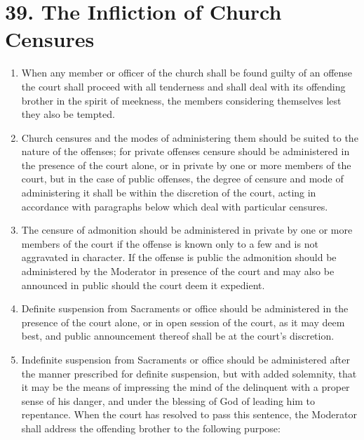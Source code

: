 \documentclass[
]{book}
\begin{document}
\hypertarget{the-infliction-of-church-censures}{%
\section*{39. The Infliction of Church Censures}\label{the-infliction-of-church-censures}}

\protect\hypertarget{chapter-slug-39-the-infliction-of-church-censures}{\href{}{}}

\begin{enumerate}
\def\labelenumi{\arabic{enumi}.}
\item
  \protect\hypertarget{39}{\href{}{}}When any member or officer of the church shall be found guilty of an offense the court shall proceed with all tenderness and shall deal with its offending brother in the spirit of meekness, the members considering themselves lest they also be tempted.
\item
  Church censures and the modes of administering them should be suited to the nature of the offenses; for private offenses censure should be administered in the presence of the court alone, or in private by one or more members of the court, but in the case of public offenses, the degree of censure and mode of administering it shall be within the discretion of the court, acting in accordance with paragraphs below which deal with particular censures.
\item
  The censure of admonition should be administered in private by one or more members of the court if the offense is known only to a few and is not aggravated in character. If the offense is public the admonition should be administered by the Moderator in presence of the court and may also be announced in public should the court deem it expedient.
\item
  Definite suspension from Sacraments or office should be administered in the presence of the court alone, or in open session of the court, as it may deem best, and public announcement thereof shall be at the court's discretion.
\item
  Indefinite suspension from Sacraments or office should be administered after the manner prescribed for definite suspension, but with added solemnity, that it may be the means of impressing the mind of the delinquent with a proper sense of his danger, and under the blessing of God of leading him to repentance. When the court has resolved to pass this sentence, the Moderator shall address the offending brother to the following purpose:


\end{enumerate}
\end{document}
